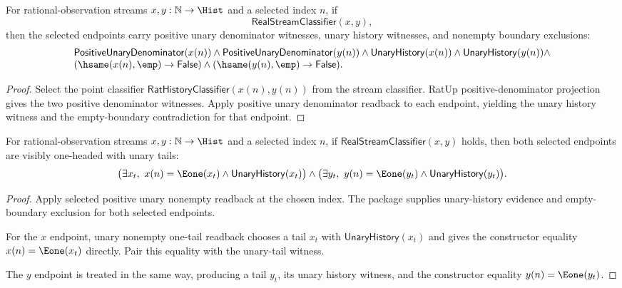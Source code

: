 \begin{theorem}
\label{thm:real-stream-classifier-selected-positive-unary-nonempty-package}
For rational-observation streams $x,y:\mathbb{N}\to\Hist$ and a selected
index $n$, if
$$
\mathsf{RealStreamClassifier}(x,y),
$$
then the selected endpoints carry positive unary denominator witnesses, unary
history witnesses, and nonempty boundary exclusions:
$$
\begin{array}{l}
\mathsf{PositiveUnaryDenominator}(x(n))\land
\mathsf{PositiveUnaryDenominator}(y(n))\land
\mathsf{UnaryHistory}(x(n))\land
\mathsf{UnaryHistory}(y(n))\land\\
(\hsame(x(n),\emp)\to\mathsf{False})\land
(\hsame(y(n),\emp)\to\mathsf{False}).
\end{array}
$$
\end{theorem}
\begin{proof}
Select the point classifier
$\mathsf{RatHistoryClassifier}(x(n),y(n))$ from the stream classifier. RatUp
positive-denominator projection gives the two positive denominator witnesses.
Apply positive unary denominator readback to each endpoint, yielding the unary
history witness and the empty-boundary contradiction for that endpoint.
\end{proof}

\begin{theorem}
\label{thm:real-stream-classifier-selected-endpoint-e1-shapes}
For rational-observation streams $x,y:\mathbb{N}\to\Hist$ and a selected
index $n$, if $\mathsf{RealStreamClassifier}(x,y)$ holds, then both selected
endpoints are visibly one-headed with unary tails:
$$
\bigl(\exists x_t,\ x(n)=\Eone(x_t)\land\mathsf{UnaryHistory}(x_t)\bigr)
\land
\bigl(\exists y_t,\ y(n)=\Eone(y_t)\land\mathsf{UnaryHistory}(y_t)\bigr).
$$
\end{theorem}
\begin{proof}
Apply selected positive unary nonempty readback at the chosen index. The
package supplies unary-history evidence and empty-boundary exclusion for both
selected endpoints.

For the $x$ endpoint, unary nonempty one-tail readback chooses a tail $x_t$
with $\mathsf{UnaryHistory}(x_t)$ and gives the constructor equality
$x(n)=\Eone(x_t)$ directly. Pair this equality with the unary-tail witness.

The $y$ endpoint is treated in the same way, producing a tail $y_t$, its unary
history witness, and the constructor equality $y(n)=\Eone(y_t)$.
\end{proof}

